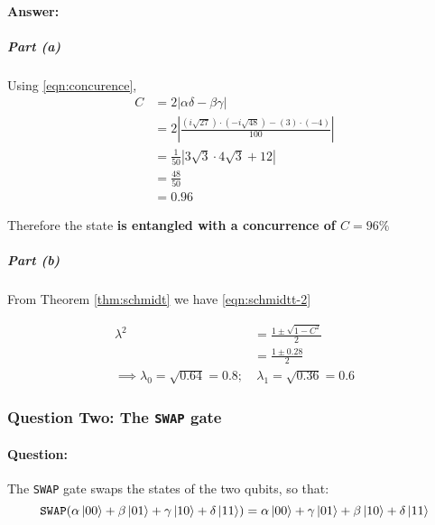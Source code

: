 \documentclass[reprint, amsmath,amssymb, aps]{revtex4-2}
\begin{document}
                    \begin{mdframed}
                    \paragraph{Answer:}

                    \subparagraph{Part (a)}
                        Using \eqref{eqn:concurence}, 
                        \begin{align*}
                            C &= 2|\alpha\delta - \beta\gamma| \\
                            &= 2\left| \frac{(i\sqrt{27})\cdot (-i\sqrt{48}) - (3)\cdot(-4)}{100}\right| \\
                            &= \frac{1}{50}\left|3\sqrt{3}\cdot4\sqrt{3} +12 \right| \\
                            &= \frac{48}{50} \\
                            &= 0.96
                        \end{align*}

                        Therefore the state \textbf{is entangled with a concurrence of $C=96\%$}

                    \subparagraph{Part (b)}
                        From Theorem \ref{thm:schmidt} we have \eqref{eqn:schmidtt-2}

                        \begin{align*}
                            \lambda^2 &= \frac{1\pm\sqrt{1-C^2}}{2} \\
                            &= \frac{1\pm 0.28}{2} \\
                            \implies \lambda_0 = \sqrt{0.64}=0.8;& \ \lambda_1  = \sqrt{0.36}=0.6
                        \end{align*}
                    
                    \end{mdframed}
            \subsubsection{Question Two: The \texttt{SWAP} gate}
                \paragraph{Question:}
                    The \texttt{SWAP} gate swaps the states of the two qubits, so that:
                    \begin{equation*}
                        \texttt{SWAP}(\alpha\ket{00}+\beta\ket{01}+\gamma\ket{10}+\delta\ket{11}) = \alpha\ket{00}+\gamma\ket{01}+\beta\ket{10}+\delta\ket{11}
                    \end{equation*}
\end{document}
